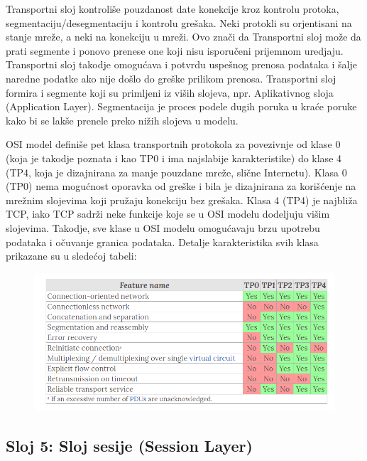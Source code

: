 \documentclass[a4paper,12pt, master]{etf}
\begin{document}
	Transportni sloj kontroli\v{s}e pouzdanost date konekcije kroz kontrolu
	protoka, segmentaciju/desegmentaciju i kontrolu gre\v{s}aka. Neki protokli
	su orjentisani na stanje mre\v{z}e, a neki na konekciju u mre\v{z}i.
	Ovo zna\v{c}i da Transportni sloj mo\v{z}e da prati segmente i ponovo
    prenese one koji nisu isporu\v{c}eni prijemnom uredjaju. Transportni sloj
    takodje omogu\'{c}ava i potvrdu uspe\v{s}nog prenosa podataka i \v{s}alje
    naredne podatke ako nije do\v{s}lo do gre\v{s}ke prilikom prenosa.
    Transportni sloj formira i segmente koji su primljeni iz vi\v{s}ih slojeva,
    npr. Aplikativnog sloja (Application Layer). Segmentacija je proces podele
    dugih poruka u kra\'{c}e poruke kako bi se lak\v{s}e prenele preko ni\v{z}ih
    slojeva u modelu.

	OSI model defini\v{s}e pet klasa transportnih protokola za povezivnje od
	klase 0 (koja je takodje poznata i kao TP0 i ima najslabije karakteristike)
	do klase 4 (TP4, koja je dizajnirana za manje pouzdane mre\v{z}e,
	sli\v{c}ne Internetu). Klasa 0 (TP0) nema mogu\'{c}nost	oporavka od
	gre\v{s}ke i bila je dizajnirana za kori\v{s}\'{c}enje na mre\v{z}nim
	slojevima koji pru\v{z}aju konekciju bez gre\v{s}aka. Klasa 4 (TP4) je
	najbli\v{z}a TCP, iako TCP sadr\v{z}i neke funkcije koje se u OSI modelu
	dodeljuju vi\v{s}im slojevima. Takodje, sve klase u OSI modelu
	omogu\'{c}avaju	brzu upotrebu podataka i o\v{c}uvanje granica podataka.
    Detalje karakteristika svih klasa prikazane su u slede\'{c}oj tabeli:

	\begin{figure}[htb]
		\centering
		\includegraphics[scale=.55]{../pic/tp_classes.png}
		\label{fig:tp_classes}
	\end{figure}
	
	\subsection{Sloj 5: Sloj sesije (Session Layer)}
\end{document}
